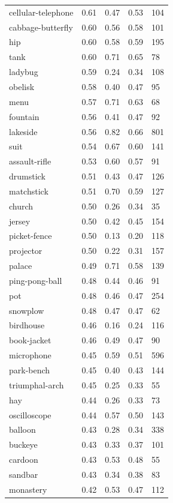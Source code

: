 \begin{center}
\begin{longtable}{lllll}
cellular-telephone & 0.61 & 0.47 & 0.53 & 104 \\
cabbage-butterfly & 0.60 & 0.56 & 0.58 & 101 \\
hip & 0.60 & 0.58 & 0.59 & 195 \\
tank & 0.60 & 0.71 & 0.65 & 78 \\
ladybug & 0.59 & 0.24 & 0.34 & 108 \\
obelisk & 0.58 & 0.40 & 0.47 & 95 \\
menu & 0.57 & 0.71 & 0.63 & 68 \\
fountain & 0.56 & 0.41 & 0.47 & 92 \\
lakeside & 0.56 & 0.82 & 0.66 & 801 \\
suit & 0.54 & 0.67 & 0.60 & 141 \\
assault-rifle & 0.53 & 0.60 & 0.57 & 91 \\
drumstick & 0.51 & 0.43 & 0.47 & 126 \\
matchstick & 0.51 & 0.70 & 0.59 & 127 \\
church & 0.50 & 0.26 & 0.34 & 35 \\
jersey & 0.50 & 0.42 & 0.45 & 154 \\
picket-fence & 0.50 & 0.13 & 0.20 & 118 \\
projector & 0.50 & 0.22 & 0.31 & 157 \\
palace & 0.49 & 0.71 & 0.58 & 139 \\
ping-pong-ball & 0.48 & 0.44 & 0.46 & 91 \\
pot & 0.48 & 0.46 & 0.47 & 254 \\
snowplow & 0.48 & 0.47 & 0.47 & 62 \\
birdhouse & 0.46 & 0.16 & 0.24 & 116 \\
book-jacket & 0.46 & 0.49 & 0.47 & 90 \\
microphone & 0.45 & 0.59 & 0.51 & 596 \\
park-bench & 0.45 & 0.40 & 0.43 & 144 \\
triumphal-arch & 0.45 & 0.25 & 0.33 & 55 \\
hay & 0.44 & 0.26 & 0.33 & 73 \\
oscilloscope & 0.44 & 0.57 & 0.50 & 143 \\
balloon & 0.43 & 0.28 & 0.34 & 338 \\
buckeye & 0.43 & 0.33 & 0.37 & 101 \\
cardoon & 0.43 & 0.53 & 0.48 & 55 \\
sandbar & 0.43 & 0.34 & 0.38 & 83 \\
monastery & 0.42 & 0.53 & 0.47 & 112 \\

\end{longtable}
\end{center}
